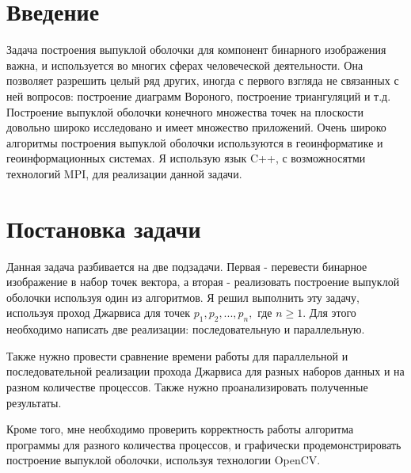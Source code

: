 \documentclass{report}
\begin{document}
\setcounter{page}{2}

\tableofcontents
\newpage

\section*{Введение}
Задача построения выпуклой оболочки для компонент бинарного изображения важна, и используется во многих сферах человеческой деятельности. Она позволяет разрешить целый ряд других, иногда с первого взгляда не связанных с ней вопросов: построение диаграмм Вороного, построение триангуляций и т.д. Построение выпуклой оболочки конечного множества точек на плоскости довольно широко исследовано и имеет множество приложений. Очень широко алгоритмы построения выпуклой оболочки используются в геоинформатике и геоинформационных системах. Я использую язык C++, с возможносятми технологий MPI, для реализации данной задачи.
\newpage

\section*{Постановка задачи}
Данная задача разбивается на две подзадачи. Первая - перевести бинарное изображение в набор точек вектора, а вторая -  реализовать построение выпуклой оболочки используя один из алгоритмов. Я решил выполнить эту задачу, используя проход Джарвиса для точек $p_1, p_2, ..., p_n,$ где $n \ge 1$. Для этого необходимо написать две реализации: последовательную и параллельную.
\par
Также нужно провести сравнение времени работы для параллельной и последовательной реализации прохода Джарвиса для разных наборов данных и на разном количестве процессов. Также нужно проанализировать полученные результаты.
\par
Кроме того, мне необходимо проверить корректность работы алгоритма программы для разного количества процессов, и графически продемонстрировать построение выпуклой оболочки, используя технологии OpenCV. 
\newpage

\end{document}
